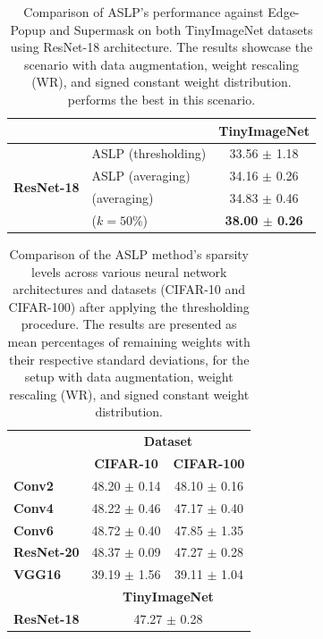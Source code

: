 \begin{table}[htbp]
  \centering
  \begin{tabular}{llc}
    \cmidrule[\heavyrulewidth]{3-3}
     &  & \textbf{TinyImageNet} \\
    \toprule
   \multirow{4}{*}{\textbf{ResNet-18}} & ASLP  (thresholding) & 33.56 $\pm$ 1.18 \\
    & ASLP (averaging) & 34.16 $\pm$ 0.26 \\
    & \cite{DBLP:conf/nips/ZhouLLY19} (averaging)  & 34.83 $\pm$ 0.46 \\
    & \cite{DBLP:conf/cvpr/RamanujanWKFR20} ($k=50\%$) &  \textbf{38.00 $\pm$ 0.26} \\
    \bottomrule
    \end{tabular}
    
  \caption{Comparison of ASLP's performance against Edge-Popup and Supermask
  \cite{DBLP:conf/cvpr/RamanujanWKFR20,DBLP:conf/nips/ZhouLLY19} on both
  TinyImageNet datasets using ResNet-18 architecture. The
  results showcase the scenario with data augmentation, weight rescaling (WR),
  and signed constant weight distribution. \cite{DBLP:conf/cvpr/RamanujanWKFR20}
  performs the best in this scenario.}
  \label{tab:chap2:tinyimagenet_performances_comparison}
\end{table}

\begin{table}[htbp]
  \centering\begin{tabular}{lcc}
    \cmidrule[\heavyrulewidth]{2-3}
     & \multicolumn{2}{c}{\textbf{Dataset}} \\
     & \textbf{CIFAR-10} & \textbf{CIFAR-100} \\
    \toprule
    \textbf{Conv2} & 48.20 $\pm$ 0.14 & 48.10 $\pm$ 0.16 \\
    \textbf{Conv4} & 48.22 $\pm$ 0.46 & 47.17 $\pm$ 0.40 \\
    \textbf{Conv6} & 48.72 $\pm$ 0.40 & 47.85 $\pm$ 1.35 \\
    \textbf{ResNet-20} & 48.37 $\pm$ 0.09 & 47.27 $\pm$ 0.28 \\
    \textbf{VGG16} & 39.19 $\pm$ 1.56 & 39.11 $\pm$ 1.04 \\
    \midrule
     & \multicolumn{2}{c}{\textbf{TinyImageNet}} \\
     \textbf{ResNet-18} & \multicolumn{2}{c}{47.27 $\pm$ 0.28} \\
    \bottomrule
    \end{tabular}
  \caption{Comparison of the ASLP method's sparsity levels across various neural
  network architectures and datasets (CIFAR-10 and CIFAR-100) after applying the
  thresholding procedure. The results are presented as mean percentages of
  remaining weights with their respective standard deviations, for the setup
  with data augmentation, weight rescaling (WR), and signed constant weight
  distribution.}
  \label{tab:chap2:observed_sparsity}
\end{table}

